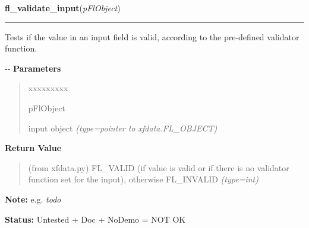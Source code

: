 \hspace{.8\funcindent}\begin{boxedminipage}{\funcwidth}

    \raggedright \textbf{fl\_validate\_input}(\textit{pFlObject})

    \vspace{-1.5ex}

    \rule{\textwidth}{0.5\fboxrule}
\setlength{\parskip}{2ex}

Tests if the value in an input field is valid, according to the
pre-defined validator function.

-{}-
\setlength{\parskip}{1ex}
      \textbf{Parameters}
      \vspace{-1ex}

      \begin{quote}
        \begin{Ventry}{xxxxxxxxx}

          \item[pFlObject]


input object
            {\it (type=pointer to xfdata.FL\_OBJECT)}

        \end{Ventry}

      \end{quote}

      \textbf{Return Value}
    \vspace{-1ex}

      \begin{quote}

(from xfdata.py) FL\_VALID (if value is valid or if there is no
validator function set for the input), otherwise FL\_INVALID
      {\it (type=int)}

      \end{quote}

\textbf{Note:} 
e.g. \emph{todo}


\textbf{Status:} 
Untested + Doc + NoDemo = NOT OK


    \end{boxedminipage}

    \label{xformslib:flinput:fl_set_input_editkeymap}

    \vspace{0.5ex}

